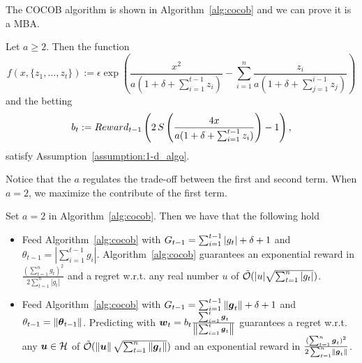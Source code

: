 The \ac{COCOB} algorithm is shown in Algorithm~\ref{alg:cocob} and we can prove it is a \ac{MBA}.
%
\begin{theorem}
\label{theo:cocob}
Let $a\geq2$. Then the function 
\[
f(x,\{z_1, \ldots, z_t\}) := \epsilon \exp\left(\frac{x^2}{a (1+\delta+\sum_{i=1}^{t-1} z_i)} - \sum_{i=1}^{n} \frac{z_i}{a( 1+\delta+\sum_{j=1}^{i-1} z_j) } \right)
\]
and the betting 
\[
b_t:= Reward_{t-1} \left(2 \, S\left(\frac{4 x}{a (1+\delta+\sum_{i=1}^{t-1} z_i)}\right)-1\right),
\]
satisfy Assumption~\ref{assumption:1-d_algo}.
% 
\end{theorem}
%
Notice that the $a$ regulates the trade-off between the first and second term. When $a=2$, we maximize the contribute of the first term.

\begin{cor}
Set $a=2$ in Algorithm~\ref{alg:cocob}. Then we have that the following hold

\begin{itemize}
\item Feed Algorithm~\ref{alg:cocob} with $G_{t-1}=\sum_{i=1}^{t-1} |g_t| + \delta + 1$ and $\theta_{t-1}=|\sum_{i=1}^{t-1} g_i|$.
Algorithm~\ref{alg:cocob} guarantees an exponential reward in $\frac{(\sum_{t=1}^n g_t)^2}{2 \sum_{t=1}^n |g_t|}$ and a regret w.r.t. any real number $u$ of $\tilde{\mathcal{O}}(|u| \sqrt{\sum_{t=1}^n |g_t|})$.

\item Feed Algorithm~\ref{alg:cocob} with $G_{t-1}=\sum_{i=1}^{t-1} \left\|{\boldsymbol{g}_t}\right\| + \delta + 1$ and $\theta_{t-1}=\left\|{{\boldsymbol{\theta}}_{t-1}}\right\|$.
Predicting with $\boldsymbol{w}_t=b_t \frac{\sum_{i=1}^t \boldsymbol{g}_t}{\left\|{\sum_{i=1}^t \boldsymbol{g}_t}\right\|}$ guarantees a regret w.r.t. any $\boldsymbol{u} \in \mathcal{H}$ of $\tilde{\mathcal{O}}(\left\|{\boldsymbol{u}}\right\| \sqrt{\sum_{t=1}^n \left\|{\boldsymbol{g}_t}\right\|})$ and an exponential reward in $\frac{(\sum_{t=1}^n \boldsymbol{g}_t)^2}{2 \sum_{t=1}^n \left\|{\boldsymbol{g}_t}\right\|}$.

\end{itemize}
\end{cor}